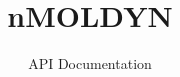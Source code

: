 \documentclass{article}
\begin{document}



\title{nMOLDYN}
\author{API Documentation}
\maketitle


\addtolength{\parskip}{-2ex}
\tableofcontents
\addtolength{\parskip}{2ex}

\end{document}
